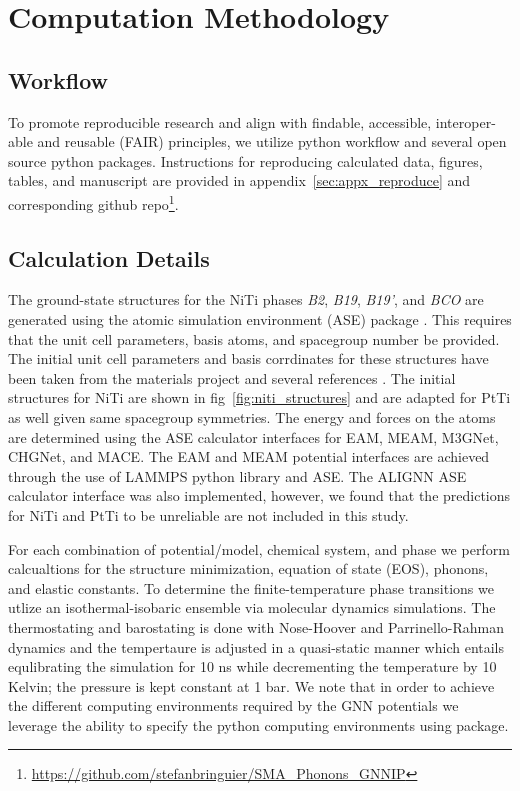 \documentclass[preprint,colorlinks=true,linkcolor=black,citecolor=black]{elsarticle}
\begin{document}
\section{Computation Methodology}
\label{sec:methods}

\subsection{Workflow}
\label{sec:workflow}
To promote reproducible research and align with findable, accessible,
interoper-able and reusable (FAIR) principles\cite{Walsh2024}, we
utilize \showyourwork python workflow\cite{Luger2021} and several open
source python packages. Instructions for reproducing calculated data,
figures, tables, and manuscript are provided in
appendix~\ref{sec:appx_reproduce} and corresponding github
repo\footnote{\url{https://github.com/stefanbringuier/SMA_Phonons_GNNIP}}.\par

\subsection{Calculation Details}
\label{sec:calc_details}
The ground-state structures for the NiTi phases \textit{B2},
\textit{B19}, \textit{B19'}, and \textit{BCO} are generated using the
atomic simulation environment (ASE) package \cite{Larsen2017}. This
requires that the unit cell parameters, basis atoms, and spacegroup
number be provided. The initial unit cell parameters and basis
corrdinates for these structures have been taken from the materials
project \cite{Jain2013} and several references
\cite{Haskins2016,Kadkhodaei2018}. The initial structures for NiTi are
shown in fig~\ref{fig:niti_structures} and are adapted for PtTi as
well given same spacegroup symmetries. The energy and forces on the
atoms are determined using the ASE calculator interfaces for EAM,
MEAM, M3GNet, CHGNet, and
MACE.\cite{Mutter2010,Zhong2011,Ko2015,Kim2017,Chen2022,Deng2023,Batatia2022}
The EAM and MEAM potential interfaces are achieved through the use of
LAMMPS python library \cite{Thompson2022} and ASE. The ALIGNN ASE
calculator interface was also implemented, however, we found that the
predictions for NiTi and PtTi to be unreliable are not included in
this study.\par

For each combination of potential/model, chemical system, and phase we
perform calcualtions for the structure minimization, equation of state
(EOS), phonons, and elastic constants. To determine the
finite-temperature phase transitions we utlize an isothermal-isobaric
ensemble via molecular dynamics simulations. The thermostating and
barostating is done with Nose-Hoover and Parrinello-Rahman dynamics
and the tempertaure is adjusted in a quasi-static manner which entails
equlibrating the simulation for 10 ns while decrementing the
temperature by 10 Kelvin; the pressure is kept constant at 1 bar. We
note that in order to achieve the different computing environments
required by the GNN potentials we leverage the ability to specify the
python computing environments using
\href{https://github.com/showyourwork/showyourwork}{\showyourwork}
package.\par
\end{document}
